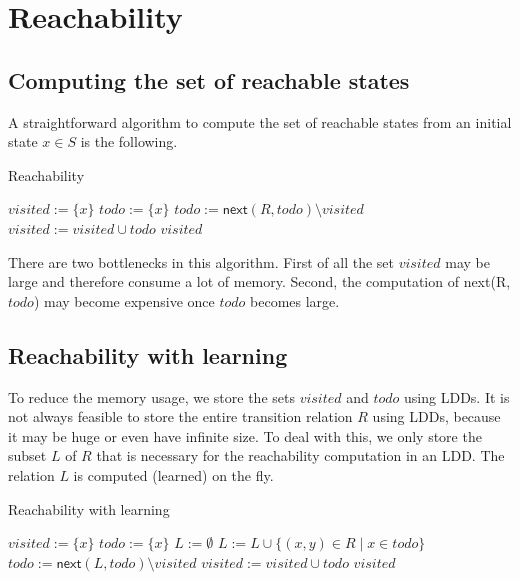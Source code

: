 \documentclass{article}
\newcommand{\var}[1]{\ensuremath{\textit{#1}}}
\begin{document}
\newpage
\section{Reachability}

\subsection{Computing the set of reachable states}
A straightforward algorithm to compute the set of reachable states from an initial state
$x \in S$ is the following.

\begin{algorithm}[ht]
\caption{Reachability}
\label{alg:reachability}
\begin{algorithmic}[1]
\State $\var{visited} := \{ x \}$
\State $\var{todo} := \{ x \}$
\While {$\var{todo} \neq \emptyset$}
    \State $\var{todo} := \textsf{next}(R, \var{todo}) \setminus \var{visited}$
    \State $\var{visited} := \var{visited} \cup \var{todo}$
\EndWhile
\State \Return \var{visited}
\EndFunction
\end{algorithmic}
\end{algorithm}

\noindent
There are two bottlenecks in this algorithm. First of all the set \var{visited} may be large and therefore consume a lot of memory. Second, the computation of \textsf{next}(R, \var{todo}) may become 
expensive once \var{todo} becomes large.

\subsection{Reachability with learning}
To reduce the memory usage, we store the sets $visited$ and $todo$ using LDDs. It is not always feasible to store the entire transition relation $R$ using LDDs, because it may be huge or even have infinite size. To deal with this, we only store the subset $L$ of $R$ that is necessary for the reachability computation in an LDD. The relation $L$ is computed (learned) on the fly.

\begin{algorithm}[ht]
\caption{Reachability with learning}
\label{alg:reachability}
\begin{algorithmic}[1]
\State $\var{visited} := \{ x \}$
\State $\var{todo} := \{ x \}$
\State $L := \emptyset$ 
\While {$\var{todo} \neq \emptyset$}
    \State $L := L \cup \{ (x,y) \in R \mid x \in \var{todo} \} $ 
    \State $\var{todo} := \textsf{next}(L, \var{todo}) \setminus \var{visited}$ 
    \State $\var{visited} := \var{visited} \cup \var{todo}$
\EndWhile
\State \Return \var{visited}
\EndFunction
\end{algorithmic}
\end{algorithm}
\end{document}
